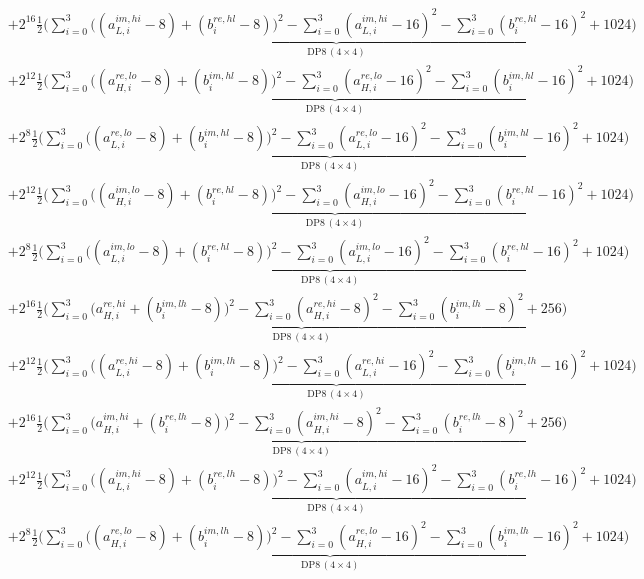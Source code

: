 \documentclass[fleqn]{article}
\newcommand{\DPop}[3]{\mathrm{DP#1}\,(#2\!\times\!#3)}
\begin{document}
\begin{align*}
  & + 2^{16}\underbrace{\tfrac12\Big(\sum_{i=0}^{3}\big((a_{L,i}^{im,hi}{-}8){+}(b_i^{re,hl}{-}8)\big)^2 - \sum_{i=0}^{3}(a_{L,i}^{im,hi}{-}16)^2 - \sum_{i=0}^{3}(b_i^{re,hl}{-}16)^2 + 1024\Big)}_{\DPop{8}{4}{4}} \\[0.35em]
  & + 2^{12}\underbrace{\tfrac12\Big(\sum_{i=0}^{3}\big((a_{H,i}^{re,lo}{-}8){+}(b_i^{im,hl}{-}8)\big)^2 - \sum_{i=0}^{3}(a_{H,i}^{re,lo}{-}16)^2 - \sum_{i=0}^{3}(b_i^{im,hl}{-}16)^2 + 1024\Big)}_{\DPop{8}{4}{4}} \\[0.35em]
  & + 2^{8}\underbrace{\tfrac12\Big(\sum_{i=0}^{3}\big((a_{L,i}^{re,lo}{-}8){+}(b_i^{im,hl}{-}8)\big)^2 - \sum_{i=0}^{3}(a_{L,i}^{re,lo}{-}16)^2 - \sum_{i=0}^{3}(b_i^{im,hl}{-}16)^2 + 1024\Big)}_{\DPop{8}{4}{4}} \\[0.35em]
  & + 2^{12}\underbrace{\tfrac12\Big(\sum_{i=0}^{3}\big((a_{H,i}^{im,lo}{-}8){+}(b_i^{re,hl}{-}8)\big)^2 - \sum_{i=0}^{3}(a_{H,i}^{im,lo}{-}16)^2 - \sum_{i=0}^{3}(b_i^{re,hl}{-}16)^2 + 1024\Big)}_{\DPop{8}{4}{4}} \\[0.35em]
  & + 2^{8}\underbrace{\tfrac12\Big(\sum_{i=0}^{3}\big((a_{L,i}^{im,lo}{-}8){+}(b_i^{re,hl}{-}8)\big)^2 - \sum_{i=0}^{3}(a_{L,i}^{im,lo}{-}16)^2 - \sum_{i=0}^{3}(b_i^{re,hl}{-}16)^2 + 1024\Big)}_{\DPop{8}{4}{4}} \\[0.35em]
  & + 2^{16}\underbrace{\tfrac12\Big(\sum_{i=0}^{3}\big(a_{H,i}^{re,hi}{+}(b_i^{im,lh}{-}8)\big)^2 - \sum_{i=0}^{3}(a_{H,i}^{re,hi}{-}8)^2 - \sum_{i=0}^{3}(b_i^{im,lh}{-}8)^2 + 256\Big)}_{\DPop{8}{4}{4}} \\[0.35em]
  & + 2^{12}\underbrace{\tfrac12\Big(\sum_{i=0}^{3}\big((a_{L,i}^{re,hi}{-}8){+}(b_i^{im,lh}{-}8)\big)^2 - \sum_{i=0}^{3}(a_{L,i}^{re,hi}{-}16)^2 - \sum_{i=0}^{3}(b_i^{im,lh}{-}16)^2 + 1024\Big)}_{\DPop{8}{4}{4}} \\[0.35em]
  & + 2^{16}\underbrace{\tfrac12\Big(\sum_{i=0}^{3}\big(a_{H,i}^{im,hi}{+}(b_i^{re,lh}{-}8)\big)^2 - \sum_{i=0}^{3}(a_{H,i}^{im,hi}{-}8)^2 - \sum_{i=0}^{3}(b_i^{re,lh}{-}8)^2 + 256\Big)}_{\DPop{8}{4}{4}} \\[0.35em]
  & + 2^{12}\underbrace{\tfrac12\Big(\sum_{i=0}^{3}\big((a_{L,i}^{im,hi}{-}8){+}(b_i^{re,lh}{-}8)\big)^2 - \sum_{i=0}^{3}(a_{L,i}^{im,hi}{-}16)^2 - \sum_{i=0}^{3}(b_i^{re,lh}{-}16)^2 + 1024\Big)}_{\DPop{8}{4}{4}} \\[0.35em]
  & + 2^{8}\underbrace{\tfrac12\Big(\sum_{i=0}^{3}\big((a_{H,i}^{re,lo}{-}8){+}(b_i^{im,lh}{-}8)\big)^2 - \sum_{i=0}^{3}(a_{H,i}^{re,lo}{-}16)^2 - \sum_{i=0}^{3}(b_i^{im,lh}{-}16)^2 + 1024\Big)}_{\DPop{8}{4}{4}} \\[0.35em]

\end{align*}
\end{document}
